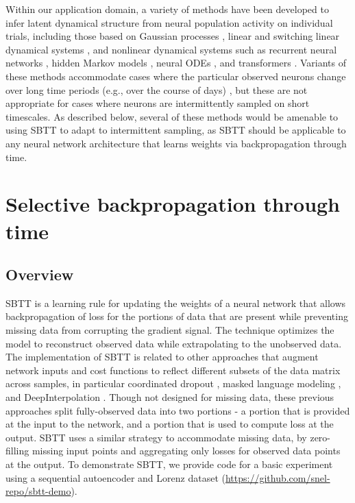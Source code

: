 \documentclass{article}
\begin{document}
Within our application domain, a variety of methods have been developed to infer latent dynamical structure from neural population activity on individual trials, including those based on Gaussian processes \cite{byron2009gaussian, duncker2019learning,zhao2017variational,wu2017gaussian}, linear \cite{macke2012empirical,gao2016linear,kao2015single} and switching linear dynamical systems \cite{petreska2011dynamical,linderman2017bayesian,glaser2020recurrent}, and nonlinear dynamical systems such as recurrent neural networks \cite{pandarinath2018inferring,keshtkaran2019enabling,she2020neural,keshtkaran2021large}, hidden Markov models \cite{hernandez2018novel}, neural ODEs \cite{kim21neuralode}, and transformers \cite{ye2021representation}. Variants of these methods accommodate cases where the particular observed neurons change over long time periods (e.g., over the course of days) \cite{pandarinath2018inferring,nonnenmacher2017extracting, kao2017leveraging}, but these are not appropriate for cases where neurons are intermittently sampled on short timescales. As described below, several of these methods would be amenable to using SBTT to adapt to intermittent sampling, as SBTT should be applicable to any neural network architecture that learns weights via backpropagation through time.



\section{Selective backpropagation through time}

\subsection{Overview}

SBTT is a learning rule for updating the weights of a neural network that allows backpropagation of loss for the portions of data that are present while preventing missing data from corrupting the gradient signal. The technique optimizes the model to reconstruct observed data while extrapolating to the unobserved data. The implementation of SBTT is related to other approaches that augment network inputs and cost functions to reflect different subsets of the data matrix across samples, in particular coordinated dropout \cite{keshtkaran2019enabling}, masked language modeling \cite{devlin2018bert}, and DeepInterpolation \cite{lecoq2020removing}. Though not designed for missing data, these previous approaches split fully-observed data into two portions - a portion that is provided at the input to the network, and a portion that is used to compute loss at the output. SBTT uses a similar strategy to accommodate missing data, by zero-filling missing input points and aggregating only losses for observed data points at the output. To demonstrate SBTT, we provide code for a basic experiment using a sequential autoencoder and Lorenz dataset (\url{https://github.com/snel-repo/sbtt-demo}).
\end{document}
